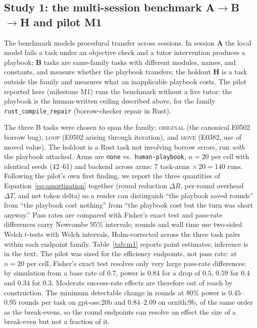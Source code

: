 \documentclass[smallcondensed,natbib]{svjour3}
\begin{document}
\subsection{Study 1: the multi-session benchmark
A$\to$B$\to$H and pilot M1}\label{sec:method-m1}

The benchmark models procedural transfer across sessions. In session
\textbf{A} the local model fails a task under an objective check and a
tutor intervention produces a playbook; \textbf{B} tasks are
same-family tasks with different modules, names, and constants, and
measure whether the playbook transfers; the holdout \textbf{H} is a
task outside the family and measures what an inapplicable playbook
costs. The pilot reported here (milestone M1) runs the benchmark
without a live tutor: the playbook is the human-written ceiling
described above, for the family \texttt{rust\_compile\_repair}
(borrow-checker repair in Rust).

The three B tasks were chosen to span the family: \textsc{original}
(the canonical E0502 borrow bug), \textsc{loop} (E0502 arising through
iteration), and \textsc{move} (E0382, use of moved value). The holdout
is a Rust task not involving borrow errors, run \emph{with} the
playbook attached. Arms are \texttt{none} vs.\
\texttt{human-playbook}, $n=20$ per cell with identical seeds
(42--61) and backend across arms: $7$ task-arms $\times\, 20 = 140$
runs. Following the pilot's own first finding, we report the three
quantities of Equation~\eqref{eq:amortization} together (round
reduction $\Delta R$, per-round overhead $\Delta T$, and net token
delta) so a reader can distinguish ``the playbook saved rounds''
from ``the playbook cost nothing'' from ``the playbook cost but the
turn was short anyway.'' Pass rates are compared with Fisher's exact
test and pass-rate differences carry Newcombe 95\% intervals; rounds
and wall time use two-sided Welch $t$-tests with Welch intervals,
Holm-corrected across the three task pairs within each endpoint
family. Table~\ref{tab:m1} reports point estimates; inference is in
the text. The pilot was sized for the efficiency endpoints, not pass
rate: at $n=20$ per cell, Fisher's exact test resolves only very large
pass-rate differences: by simulation from a base rate of $0.7$, power
is $0.84$ for a drop of $0.5$, $0.59$ for $0.4$ and $0.34$ for $0.3$.
Moderate success-rate effects are therefore out of reach by
construction. The minimum detectable change in rounds at $80\%$ power
is $0.45$--$0.95$ rounds per task on gpt-oss:20b and $0.84$--$2.09$
on ornith:9b, of the same order as the break-evens, so the round
endpoints can resolve an effect the size of a break-even but not a
fraction of it.
\end{document}
